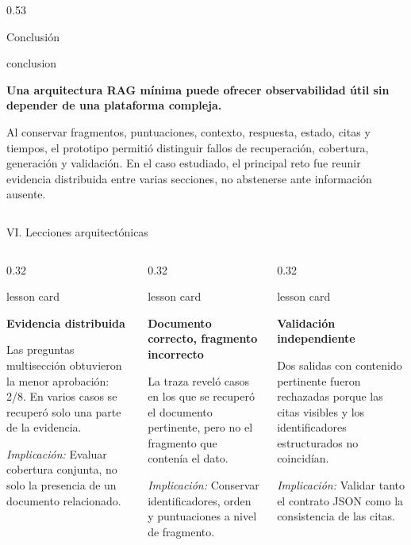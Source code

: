 \documentclass[final]{beamer}
\newcommand{\lessoncard}[3]{%
  \begin{beamercolorbox}[wd=\linewidth,sep=0.58cm]{lesson card}
    {\color{Navy}\bfseries\fontsize{25}{29}\selectfont #1\par}
    \vspace{0.16cm}
    {\fontsize{22}{27}\selectfont #2\par}
    \vspace{0.16cm}
    {\fontsize{21}{25}\selectfont\textit{Implicación:} #3\par}
  \end{beamercolorbox}
}
\begin{document}
\begin{frame}[t]
\begin{columns}[T,totalwidth=\textwidth]
\begin{column}{0.53\textwidth}
\begin{block}{Conclusión}
\begin{beamercolorbox}[wd=\linewidth,sep=0.80cm]{conclusion}
  {\bfseries\fontsize{29}{34}\selectfont
  Una arquitectura RAG mínima puede ofrecer observabilidad útil sin depender
  de una plataforma compleja.\par}
  \vspace{0.24cm}
  {\fontsize{23}{28}\selectfont\justifying
  \leftskip=0.45cm
  \rightskip=0.45cm
  Al conservar fragmentos, puntuaciones, contexto, respuesta, estado,
  citas y tiempos, el prototipo permitió distinguir fallos de
  recuperación, cobertura, generación y validación. En el caso estudiado,
  el principal reto fue reunir evidencia distribuida entre varias
  secciones, no abstenerse ante información ausente.\par}
\end{beamercolorbox}
\end{block}

\end{column}
\end{columns}

\vspace{0.75cm}

\begin{block}{VI. Lecciones arquitectónicas}
\begin{columns}[T,totalwidth=\linewidth]
  \begin{column}{0.32\linewidth}
    \lessoncard{Evidencia distribuida}{Las preguntas multisección obtuvieron la
    menor aprobación: 2/8. En varios casos se recuperó solo una parte de la
    evidencia.}{Evaluar cobertura conjunta, no solo la presencia de un
    documento relacionado.}
  \end{column}
  \begin{column}{0.32\linewidth}
    \lessoncard{Documento correcto, fragmento incorrecto}{La traza reveló casos
    en los que se recuperó el documento pertinente, pero no el fragmento que
    contenía el dato.}{Conservar identificadores, orden y puntuaciones a nivel
    de fragmento.}
  \end{column}
  \begin{column}{0.32\linewidth}
    \lessoncard{Validación independiente}{Dos salidas con contenido pertinente
    fueron rechazadas porque las citas visibles y los identificadores
    estructurados no coincidían.}{Validar tanto el contrato JSON como la
    consistencia de las citas.}
  \end{column}
\end{columns}
\end{block}


\end{frame}
\end{document}
